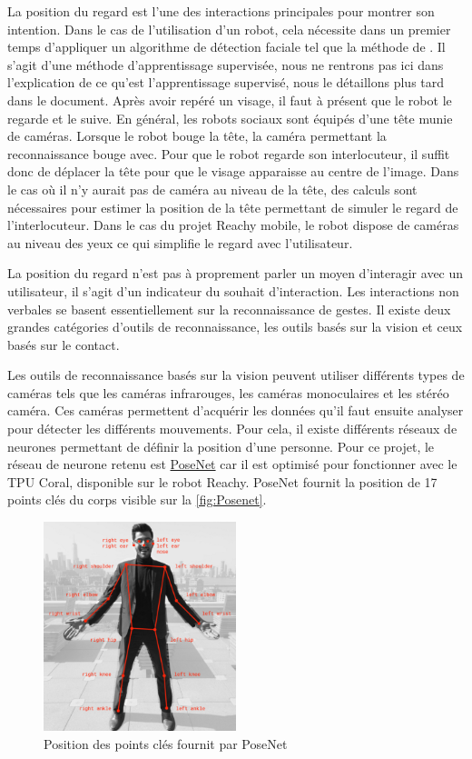 La position du regard est l’une des interactions principales pour montrer son intention. Dans le cas de l’utilisation d’un robot, cela nécessite dans un premier temps d’appliquer un algorithme de détection faciale  tel que la méthode de \cite{viola_robust_nodate}. Il s’agit d’une méthode d’apprentissage supervisée, nous ne rentrons pas ici dans l’explication de ce qu’est l’apprentissage supervisé, nous le détaillons plus tard dans le document. Après avoir repéré un visage, il faut à présent que le robot le regarde et le suive. En général, les robots sociaux sont équipés d’une tête munie de caméras. Lorsque le robot bouge la tête, la caméra permettant la reconnaissance bouge avec. Pour que le robot regarde son interlocuteur, il suffit donc de déplacer la tête pour que le visage apparaisse au centre de l’image. Dans le cas où il n’y aurait pas de caméra au niveau de la tête, des calculs sont nécessaires pour estimer la position de la tête permettant de simuler le regard de l’interlocuteur. Dans le cas du projet Reachy mobile, le robot dispose de caméras au niveau des yeux ce qui simplifie le regard avec l’utilisateur.

La position du regard n’est pas à proprement parler un moyen d’interagir avec un utilisateur, il s’agit d’un indicateur du souhait d'interaction. Les interactions non verbales se basent essentiellement sur la reconnaissance de gestes. Il existe deux grandes catégories d’outils de reconnaissance, les outils basés sur la vision et ceux basés sur le contact. \cite{hiyadi_reconnaissance_2016}
 
Les outils de reconnaissance basés sur la vision peuvent utiliser différents types de caméras tels que les caméras infrarouges, les caméras monoculaires et les stéréo caméra. Ces caméras permettent d’acquérir les données qu’il faut ensuite analyser pour détecter les différents mouvements. Pour cela, il existe différents réseaux de neurones permettant de définir la position d’une personne. Pour ce projet, le réseau de neurone retenu est \href{https://github.com/google-coral/project-posenet}{PoseNet}  car il est optimisé pour fonctionner avec le TPU Coral, disponible sur le robot Reachy. PoseNet fournit la position de 17 points clés du corps visible sur la \autoref{fig:Posenet}.

\begin{figure}[ht!]
    \centering
    \includegraphics[width=0.5\textwidth]{Rapport/images/posenet.png}
    \caption{Position des points clés fournit par PoseNet}
    \label{fig:Posenet}
\end{figure}

